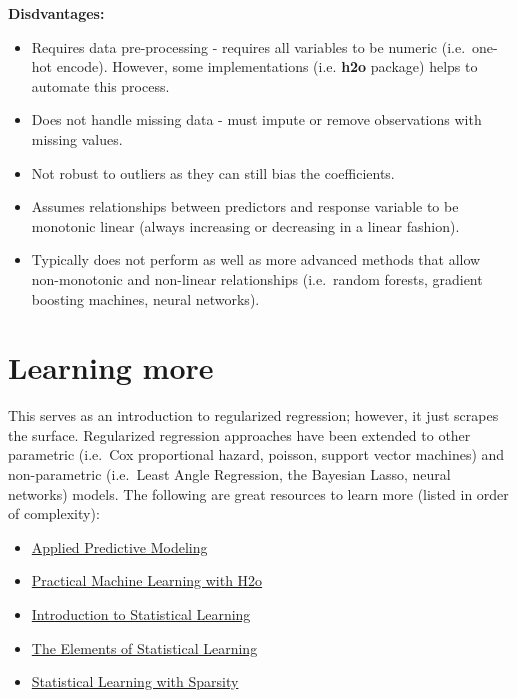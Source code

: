 \documentclass[]{book}
\providecommand{\tightlist}{%
  \setlength{\itemsep}{0pt}\setlength{\parskip}{0pt}}
\theoremstyle{definition}
\theoremstyle{definition}
\theoremstyle{definition}
\theoremstyle{remark}
\begin{document}
\textbf{Disdvantages:}

\begin{itemize}
\tightlist
\item
  Requires data pre-processing - requires all variables to be numeric
  (i.e.~one-hot encode). However, some implementations (i.e.
  \textbf{h2o} package) helps to automate this process.
\item
  Does not handle missing data - must impute or remove observations with
  missing values.
\item
  Not robust to outliers as they can still bias the coefficients.
\item
  Assumes relationships between predictors and response variable to be
  monotonic linear (always increasing or decreasing in a linear
  fashion).
\item
  Typically does not perform as well as more advanced methods that allow
  non-monotonic and non-linear relationships (i.e.~random forests,
  gradient boosting machines, neural networks).
\end{itemize}

\hypertarget{learning-more-2}{%
\section{Learning more}\label{learning-more-2}}

This serves as an introduction to regularized regression; however, it
just scrapes the surface. Regularized regression approaches have been
extended to other parametric (i.e.~Cox proportional hazard, poisson,
support vector machines) and non-parametric (i.e.~Least Angle
Regression, the Bayesian Lasso, neural networks) models. The following
are great resources to learn more (listed in order of complexity):

\begin{itemize}
\tightlist
\item
  \href{https://www.amazon.com/Applied-Predictive-Modeling-Max-Kuhn/dp/1461468485/ref=sr_1_1?ie=UTF8\&qid=1522246635\&sr=8-1\&keywords=applied+predictive+modelling}{Applied
  Predictive Modeling}
\item
  \href{https://www.amazon.com/Practical-Machine-Learning-H2O-Techniques/dp/149196460X}{Practical
  Machine Learning with H2o}
\item
  \href{https://www.amazon.com/Introduction-Statistical-Learning-Applications-Statistics/dp/1461471370/ref=sr_1_2?ie=UTF8\&qid=1522246635\&sr=8-2\&keywords=applied+predictive+modelling}{Introduction
  to Statistical Learning}
\item
  \href{https://www.amazon.com/Elements-Statistical-Learning-Prediction-Statistics/dp/0387848576/ref=sr_1_3?ie=UTF8\&qid=1522246635\&sr=8-3\&keywords=applied+predictive+modelling}{The
  Elements of Statistical Learning}
\item
  \href{https://www.amazon.com/Statistical-Learning-Sparsity-Generalizations-Probability/dp/1498712169/ref=sr_1_1?ie=UTF8\&qid=1522246685\&sr=8-1\&keywords=statistical+learning+with+sparsity}{Statistical
  Learning with Sparsity}
\end{itemize}
\end{document}
